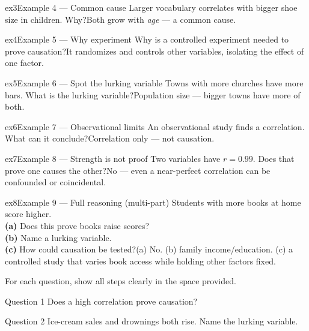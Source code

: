 \documentclass[11pt]{article}
\begin{document}
\begin{example}{ex3}{Example 4 --- Common cause}
Larger vocabulary correlates with bigger shoe size in children. Why?\soln Both grow with \emph{age} --- a common cause.
\end{example}

\begin{example}{ex4}{Example 5 --- Why experiment}
Why is a controlled experiment needed to prove causation?\soln It randomizes and controls other variables, isolating the effect of one factor.
\end{example}

\begin{example}{ex5}{Example 6 --- Spot the lurking variable}
Towns with more churches have more bars. What is the lurking variable?\soln Population size --- bigger towns have more of both.
\end{example}

\begin{example}{ex6}{Example 7 --- Observational limits}
An observational study finds a correlation. What can it conclude?\soln Correlation only --- not causation.
\end{example}

\begin{example}{ex7}{Example 8 --- Strength is not proof}
Two variables have $r=0.99$. Does that prove one causes the other?\soln No --- even a near-perfect correlation can be confounded or coincidental.
\end{example}

\begin{example}{ex8}{Example 9 --- Full reasoning (multi-part)}
Students with more books at home score higher. \\ \textbf{(a)} Does this prove books raise scores? \\ \textbf{(b)} Name a lurking variable. \\ \textbf{(c)} How could causation be tested?\soln (a) No. (b) family income/education. (c) a controlled study that varies book access while holding other factors fixed.
\end{example}

\clearpage
{}
For each question, show all steps clearly in the space provided.

\begin{qbox}{Question 1}
Does a high correlation prove causation?\workspace{2.4cm}
\end{qbox}

\begin{qbox}{Question 2}
Ice-cream sales and drownings both rise. Name the lurking variable.\workspace{2.4cm}
\end{qbox}
\end{document}
